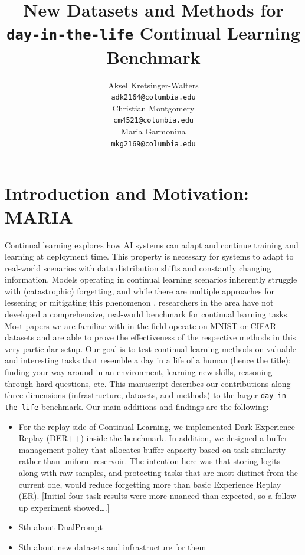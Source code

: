 \documentclass{article}
\title{New Datasets and Methods for \texttt{day-in-the-life} Continual Learning Benchmark}
\begin{document}

\author{%
  Aksel Kretsinger-Walters \\
  \texttt{adk2164@columbia.edu} \\
  \And
  Christian Montgomery \\
  \texttt{cm4521@columbia.edu} \\
  \And
  Maria Garmonina \\
  \texttt{mkg2169@columbia.edu} \\
}

\maketitle

\begin{abstract}

\end{abstract}

\section{Introduction and Motivation: MARIA}
Continual learning explores how AI systems can adapt and continue training and learning at deployment time.
This property is necessary for systems to adapt to real-world scenarios with data distribution shifts and
constantly changing information. Models operating in continual learning scenarios inherently struggle with
(catastrophic) forgetting, and while there are multiple approaches for lessening or mitigating this
phenomenon \cite{cl-overview}, researchers in the area have not developed a comprehensive, real-world
benchmark for continual learning tasks. Most papers we are familiar with in the field operate on MNIST or
CIFAR datasets and are able to prove the effectiveness of the respective methods in this very particular
setup. Our goal is to test continual learning methods on valuable and interesting tasks that resemble a day
in a life of a human (hence the title): finding your way around in an environment, learning new skills,
reasoning through hard questions, etc. This manuscript describes our contributions along three dimensions
(infrastructure, datasets, and methods) to the larger \texttt{day-in-the-life} benchmark. Our main additions
and findings are the following:
\begin{itemize}
		\item For the replay side of Continual Learning, we implemented Dark Experience Replay (DER++) inside the
				benchmark. In addition, we designed a buffer management policy that allocates buffer capacity based on
				task similarity rather than uniform reservoir. The intention here was that storing logits along with raw
				samples, and protecting tasks that are most distinct from the current one, would reduce forgetting more
				than basic Experience Replay (ER). [Initial four-task results were more nuanced than expected, so a
				follow-up experiment showed….]
		\item Sth about DualPrompt
		\item Sth about new datasets and infrastructure for them
\end{itemize}
\end{document}
